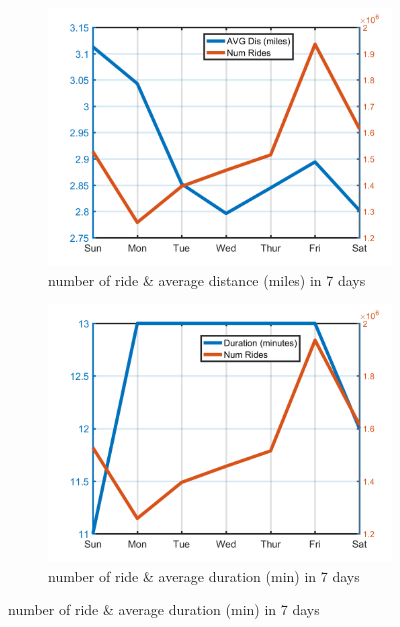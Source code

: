 \documentclass{article}
\begin{document}
\begin{figure}
\begin{subfigure}{.5\linewidth}
  \centering
  \includegraphics[width=.8\linewidth]{numride_dow}
  \caption{number of ride \& average distance (miles) in 7 days}
  \label{fig:sub3}
\end{subfigure}%
\begin{subfigure}{.5\linewidth}
  \centering
  \includegraphics[width=.8\linewidth]{numride_dow_dur}
  \caption{number of ride \& average duration (min) in 7 days}
  \label{fig:sub4}
\end{subfigure}


\end{figure}
\end{document}
